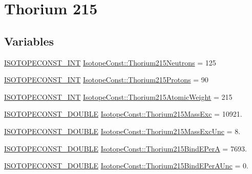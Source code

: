 \hypertarget{group___isotope_const-_thorium-_th215}{}\section{Thorium 215}
\label{group___isotope_const-_thorium-_th215}
\subsection*{Variables}
\begin{DoxyCompactItemize}
\item 
\mbox{\hyperlink{group___isotope_const-_macros_ga5f18360b3e99483a35c32d789e62621c}{I\+S\+O\+T\+O\+P\+E\+C\+O\+N\+S\+T\+\_\+\+I\+NT}} \mbox{\hyperlink{group___isotope_const-_thorium-_th215_gaf06f4a55a2c793584eca894132af8a61}{Isotope\+Const\+::\+Thorium215\+Neutrons}} = 125
\item 
\mbox{\hyperlink{group___isotope_const-_macros_ga5f18360b3e99483a35c32d789e62621c}{I\+S\+O\+T\+O\+P\+E\+C\+O\+N\+S\+T\+\_\+\+I\+NT}} \mbox{\hyperlink{group___isotope_const-_thorium-_th215_ga2a066ddfc7cb178f2996d503899d1e0f}{Isotope\+Const\+::\+Thorium215\+Protons}} = 90
\item 
\mbox{\hyperlink{group___isotope_const-_macros_ga5f18360b3e99483a35c32d789e62621c}{I\+S\+O\+T\+O\+P\+E\+C\+O\+N\+S\+T\+\_\+\+I\+NT}} \mbox{\hyperlink{group___isotope_const-_thorium-_th215_ga0bf24e0c7119b22cc3009e84c8321419}{Isotope\+Const\+::\+Thorium215\+Atomic\+Weight}} = 215
\item 
\mbox{\hyperlink{group___isotope_const-_macros_ga8f45a7272ce02c0b4c65c44636ed719a}{I\+S\+O\+T\+O\+P\+E\+C\+O\+N\+S\+T\+\_\+\+D\+O\+U\+B\+LE}} \mbox{\hyperlink{group___isotope_const-_thorium-_th215_gac387d9b9b027fda8d3cca14d65a8fd74}{Isotope\+Const\+::\+Thorium215\+Mass\+Exc}} = 10921.
\item 
\mbox{\hyperlink{group___isotope_const-_macros_ga8f45a7272ce02c0b4c65c44636ed719a}{I\+S\+O\+T\+O\+P\+E\+C\+O\+N\+S\+T\+\_\+\+D\+O\+U\+B\+LE}} \mbox{\hyperlink{group___isotope_const-_thorium-_th215_ga8055e65fd03f3fe803f0907ceef73c36}{Isotope\+Const\+::\+Thorium215\+Mass\+Exc\+Unc}} = 8.
\item 
\mbox{\hyperlink{group___isotope_const-_macros_ga8f45a7272ce02c0b4c65c44636ed719a}{I\+S\+O\+T\+O\+P\+E\+C\+O\+N\+S\+T\+\_\+\+D\+O\+U\+B\+LE}} \mbox{\hyperlink{group___isotope_const-_thorium-_th215_ga32eb1474dae70c6a8fae3fd396eb1117}{Isotope\+Const\+::\+Thorium215\+Bind\+E\+PerA}} = 7693.
\item 
\mbox{\hyperlink{group___isotope_const-_macros_ga8f45a7272ce02c0b4c65c44636ed719a}{I\+S\+O\+T\+O\+P\+E\+C\+O\+N\+S\+T\+\_\+\+D\+O\+U\+B\+LE}} \mbox{\hyperlink{group___isotope_const-_thorium-_th215_ga01f677b49c81292691608681cadbfc07}{Isotope\+Const\+::\+Thorium215\+Bind\+E\+Per\+A\+Unc}} = 0.

\end{DoxyCompactItemize}
